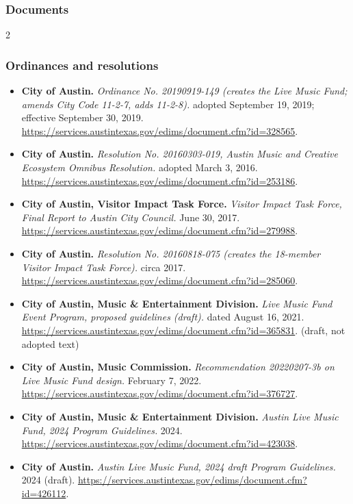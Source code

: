 \subsubsection*{Documents}
{\scriptsize\renewcommand{\baselinestretch}{0.88}\selectfont\raggedright
\begin{multicols}{2}
\setlength{\parskip}{0pt}
\subsubsection*{Ordinances and resolutions}
\begin{itemize}[itemsep=0pt,topsep=1pt,parsep=0pt,partopsep=0pt,leftmargin=1em]
\item \textbf{City of Austin.} \textit{Ordinance No. 20190919-149 (creates the Live Music Fund; amends City Code 11-2-7, adds 11-2-8).} adopted September 19, 2019; effective September 30, 2019. \url{https://services.austintexas.gov/edims/document.cfm?id=328565}.
\item \textbf{City of Austin.} \textit{Resolution No. 20160303-019, Austin Music and Creative Ecosystem Omnibus Resolution.} adopted March 3, 2016. \url{https://services.austintexas.gov/edims/document.cfm?id=253186}.
\item \textbf{City of Austin, Visitor Impact Task Force.} \textit{Visitor Impact Task Force, Final Report to Austin City Council.} June 30, 2017. \url{https://services.austintexas.gov/edims/document.cfm?id=279988}.
\item \textbf{City of Austin.} \textit{Resolution No. 20160818-075 (creates the 18-member Visitor Impact Task Force).} circa 2017. \url{https://services.austintexas.gov/edims/document.cfm?id=285060}.
\item \textbf{City of Austin, Music \& Entertainment Division.} \textit{Live Music Fund Event Program, proposed guidelines (draft).} dated August 16, 2021. \url{https://services.austintexas.gov/edims/document.cfm?id=365831}. {\color{ammuted}(draft, not adopted text)}
\item \textbf{City of Austin, Music Commission.} \textit{Recommendation 20220207-3b on Live Music Fund design.} February 7, 2022. \url{https://services.austintexas.gov/edims/document.cfm?id=376727}.
\item \textbf{City of Austin, Music \& Entertainment Division.} \textit{Austin Live Music Fund, 2024 Program Guidelines.} 2024. \url{https://services.austintexas.gov/edims/document.cfm?id=423038}.
\item \textbf{City of Austin.} \textit{Austin Live Music Fund, 2024 draft Program Guidelines.} 2024 (draft). \url{https://services.austintexas.gov/edims/document.cfm?id=426112}.

\end{itemize}
\end{multicols}}
